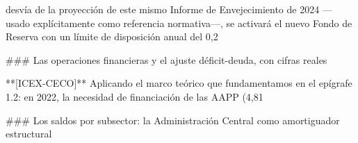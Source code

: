 \documentclass[10pt,a4paper]{article}
\begin{document}
desvía de la proyección de este mismo Informe de Envejecimiento de 2024 —usado explícitamente como referencia normativa—, se activará el nuevo Fondo de Reserva con un límite de disposición anual del 0,2%

### Las operaciones financieras y el ajuste déficit-deuda, con cifras reales

**[ICEX-CECO]** Aplicando el marco teórico que fundamentamos en el epígrafe 1.2: en 2022, la necesidad de financiación de las AAPP (4,81%

### Los saldos por subsector: la Administración Central como amortiguador estructural
\end{document}
